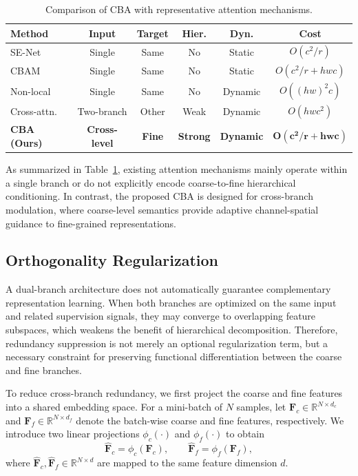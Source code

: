 \documentclass[pdflatex,iicol,sn-mathphys-num]{sn-jnl}
\theoremstyle{thmstyleone}%
\theoremstyle{thmstyletwo}%
\theoremstyle{thmstylethree}%
\begin{document}
\begin{table}[h]
    \centering
    \caption{Comparison of CBA with representative attention mechanisms.}
    \label{tab:attention_comparison}
    \small
    \setlength{\tabcolsep}{4pt}
    \renewcommand{\arraystretch}{1.05}
    \begin{tabular}{@{}lccccc@{}}
    \toprule
    \textbf{Method} & \textbf{Input} & \textbf{Target} & \textbf{Hier.} & \textbf{Dyn.} & \textbf{Cost} \\
    \midrule
    SE-Net      & Single     & Same  & No   & Static  & $O(c^2/r)$ \\
    CBAM        & Single     & Same  & No   & Static  & $O(c^2/r + hwc)$ \\
    Non-local   & Single     & Same  & No   & Dynamic & $O((hw)^2c)$ \\
    Cross-attn. & Two-branch & Other & Weak & Dynamic & $O(hwc^2)$ \\
    \midrule
    \textbf{CBA (Ours)} & \textbf{Cross-level} & \textbf{Fine} & \textbf{Strong} & \textbf{Dynamic} & $\mathbf{O(c^2/r + hwc)}$ \\
    \bottomrule
    \end{tabular}
    \end{table}

As summarized in Table~\ref{tab:attention_comparison}, existing attention mechanisms mainly operate within a single branch or do not explicitly encode coarse-to-fine hierarchical conditioning. In contrast, the proposed CBA is designed for cross-branch modulation, where coarse-level semantics provide adaptive channel-spatial guidance to fine-grained representations.

\subsection{Orthogonality Regularization}
\label{sec:orth}

A dual-branch architecture does not automatically guarantee complementary representation learning. 
When both branches are optimized on the same input and related supervision signals, they may converge to overlapping feature subspaces, which weakens the benefit of hierarchical decomposition. 
Therefore, redundancy suppression is not merely an optional regularization term, but a necessary constraint for preserving functional differentiation between the coarse and fine branches.

To reduce cross-branch redundancy, we first project the coarse and fine features into a shared embedding space. 
For a mini-batch of $N$ samples, let $\mathbf{F}_c \in \mathbb{R}^{N \times d_c}$ and $\mathbf{F}_f \in \mathbb{R}^{N \times d_f}$ denote the batch-wise coarse and fine features, respectively. 
We introduce two linear projections $\phi_c(\cdot)$ and $\phi_f(\cdot)$ to obtain
\begin{equation}
\hat{\mathbf{F}}_c = \phi_c(\mathbf{F}_c), \qquad
\hat{\mathbf{F}}_f = \phi_f(\mathbf{F}_f),
\end{equation}
where $\hat{\mathbf{F}}_c, \hat{\mathbf{F}}_f \in \mathbb{R}^{N \times d}$ are mapped to the same feature dimension $d$.
\end{document}
